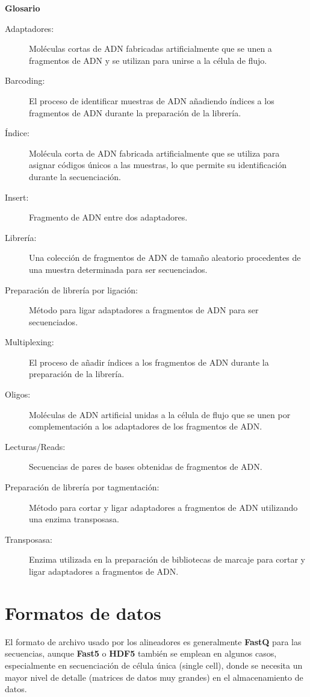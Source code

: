 \begin{table}[htbp]
\begin{mdframed}[backgroundcolor=black!10]
    \centering
\textbf{Glosario}
\begin{description}
\item[Adaptadores:] Moléculas cortas de ADN fabricadas artificialmente que se unen a fragmentos de ADN y se utilizan para unirse a la célula de flujo.
\item[Barcoding:] El proceso de identificar muestras de ADN añadiendo índices a los fragmentos de ADN durante la preparación de la librería.
\item[Índice:] Molécula corta de ADN fabricada artificialmente que se utiliza para asignar códigos únicos a las muestras, lo que permite su identificación durante la secuenciación.
\item[Insert:] Fragmento de ADN entre dos adaptadores.
\item[Librería:] Una colección de fragmentos de ADN de tamaño aleatorio procedentes de una muestra determinada para ser secuenciados.
\item[Preparación de librería por ligación:] Método para ligar adaptadores a fragmentos de ADN para ser secuenciados.
\item[Multiplexing:] El proceso de añadir índices a los fragmentos de ADN durante la preparación de la librería.
\item[Oligos:] Moléculas de ADN artificial unidas a la célula de flujo que se unen por complementación a los adaptadores de los fragmentos de ADN.
\item[Lecturas/Reads:] Secuencias de pares de bases obtenidas de fragmentos de ADN.
\item[Preparación de librería por tagmentación:] Método para cortar y ligar adaptadores a fragmentos de ADN utilizando una enzima transposasa.
\item[Transposasa:] Enzima utilizada en la preparación de bibliotecas de marcaje para cortar y ligar adaptadores a fragmentos de ADN.
\end{description}
    \end{mdframed}
\end{table}

\section{Formatos de datos}
El formato de archivo usado por los alineadores es generalmente \textbf{FastQ} para las secuencias, aunque \textbf{Fast5} o \textbf{HDF5} también se emplean en algunos casos, especialmente en secuenciación de célula única (single cell), donde se necesita un mayor nivel de detalle (matrices de datos muy grandes) en el almacenamiento de datos.

